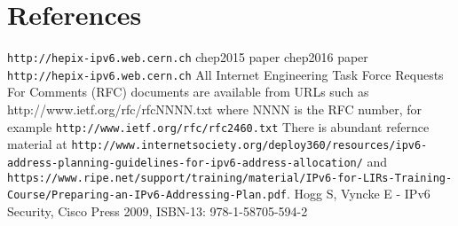 \section*{References}

\begin{thebibliography}{1}
 {\tt http://hepix-ipv6.web.cern.ch}
 {chep2015 paper}
 {chep2016 paper}
 {\tt http://hepix-ipv6.web.cern.ch}
 All Internet Engineering Task Force Requests For Comments (RFC) documents are available
from URLs such as http://www.ietf.org/rfc/rfcNNNN.txt where NNNN is the RFC number, for example {\tt http://www.ietf.org/rfc/rfc2460.txt}
 There is abundant refernce material at
{\tt http://www.internetsociety.org/deploy360/resources/ipv6-address-planning-guidelines-for-ipv6-address-allocation/} and {\tt https://www.ripe.net/support/training/material/IPv6-for-LIRs-Training-Course/Preparing-an-IPv6-Addressing-Plan.pdf}.
    Hogg S, Vyncke E - IPv6 Security, Cisco Press 2009, ISBN-13: 978-1-58705-594-2
\end{thebibliography}

